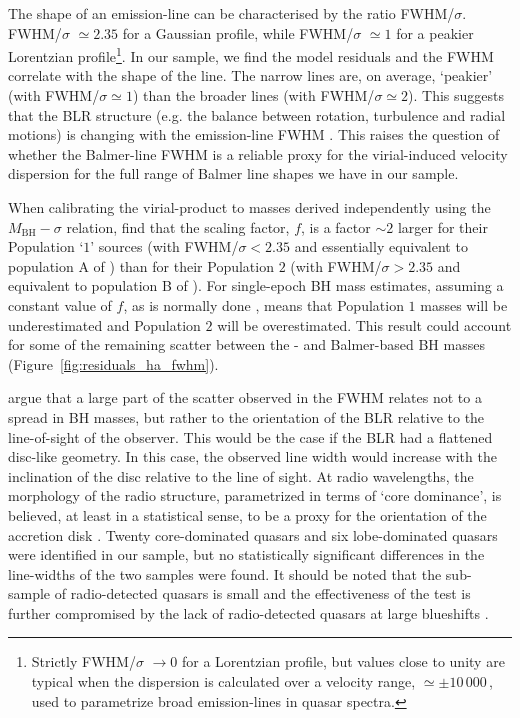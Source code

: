 The shape of an emission-line can be characterised by the ratio FWHM/$\sigma$.  
FWHM/$\sigma$ $\simeq 2.35$ for a Gaussian profile, while FWHM/$\sigma$ $\simeq 1$ for a peakier Lorentzian profile\footnote{Strictly FWHM/$\sigma$ $\rightarrow 0$ for a Lorentzian profile, but values close to unity are typical when the dispersion is calculated over a velocity range, $\simeq\pm10\,000$\,\kms, used to parametrize broad emission-lines in quasar spectra.}.
In our sample, we find the model residuals and the \ha FWHM correlate with the shape of the line.   
The narrow lines are, on average, `peakier' (with FWHM/$\sigma\simeq1$) than the broader lines (with FWHM/$\sigma\simeq2$).   
This suggests that the BLR structure (e.g. the balance between rotation, turbulence and radial motions) is changing with the emission-line FWHM \citep[e.g.][]{collin06,kollatschny11,Kollatschny13}. 
This raises the question of whether the Balmer-line FWHM is a reliable proxy for the virial-induced velocity dispersion for the full range of Balmer line shapes we have in our sample. 

When calibrating the virial-product to masses derived independently using the $M_{\text{BH}}-\sigma$ relation, \citet{collin06} find that the scaling factor, $f$, is a factor $\sim2$ larger for their Population `$1$' sources (with FWHM/$\sigma < 2.35$ and essentially equivalent to population A of \citealt{sulentic00b}) than for their Population $2$ (with FWHM/$\sigma > 2.35$ and equivalent to population B of \citealt{sulentic00b}). 
For single-epoch BH mass estimates, assuming a constant value of $f$, as is normally done \citep[e.g.][]{vestergaard06}, means that Population $1$ masses will be underestimated and Population $2$ will be overestimated.
This result could account for some of the remaining scatter between the - and Balmer-based BH masses (Figure~\ref{fig:residuals_ha_fwhm}). 

\citet{shen14} argue that a large part of the scatter observed in the \hb FWHM relates not to a spread in BH masses, but rather to the orientation of the BLR relative to the line-of-sight of the observer.
This would be the case if the BLR had a flattened disc-like geometry. 
In this case, the observed line width would increase with the inclination of the disc relative to the line of sight. 
At radio wavelengths, the morphology of the radio structure, parametrized in terms of `core dominance', is believed, at least in a statistical sense, to be a proxy for the orientation of the accretion disk \citep[e.g.][]{jackson91}.
Twenty core-dominated quasars and six lobe-dominated quasars were identified in our sample, but no statistically significant differences in the \ha line-widths of the two samples were found. 
It should be noted that the sub-sample of radio-detected quasars is small and the effectiveness of the test is further compromised by the lack of radio-detected quasars at large blueshifts \citep[see figure 14 of][for example]{richards11}.

